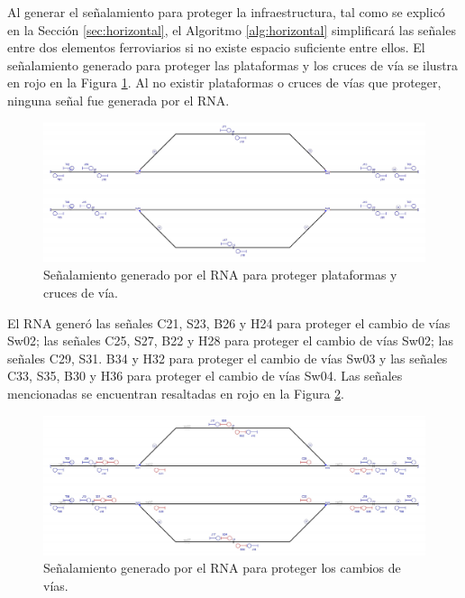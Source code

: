 	Al generar el señalamiento para proteger la infraestructura, tal como se explicó en la Sección \ref{sec:horizontal}, el Algoritmo \ref{alg:horizontal} simplificará las señales entre dos elementos ferroviarios si no existe espacio suficiente entre ellos. El señalamiento generado para proteger las plataformas y los cruces de vía se ilustra en rojo en la Figura \ref{fig:EJ5_5}. Al no existir plataformas o cruces de vías que proteger, ninguna señal fue generada por el RNA.
	
	\begin{figure}[H]
		\centering
		\includegraphics[width=1\textwidth]{resultados-obtenidos/ejemplo5/images/5_step3.png}
		\centering\caption{Señalamiento generado por el RNA para proteger plataformas y cruces de vía.}
		\label{fig:EJ5_5}
	\end{figure}
	
	El RNA generó las señales C21, S23, B26 y H24 para proteger el cambio de vías Sw02; las señales C25, S27, B22 y H28 para proteger el cambio de vías Sw02; las señales C29, S31. B34 y H32 para proteger el cambio de vías Sw03 y las señales C33, S35, B30 y H36 para proteger el cambio de vías Sw04. Las señales mencionadas se encuentran resaltadas en rojo en la Figura \ref{fig:EJ5_6}.
	
	\begin{figure}[H]
		\centering
		\includegraphics[width=1\textwidth]{resultados-obtenidos/ejemplo5/images/5_step4.png}
		\centering\caption{Señalamiento generado por el RNA para proteger los cambios de vías.}
		\label{fig:EJ5_6}
	\end{figure}
	
